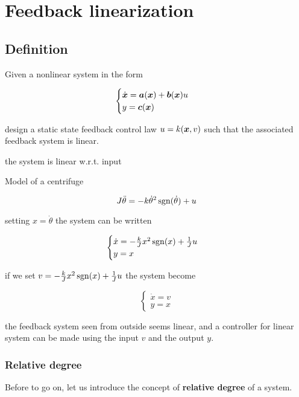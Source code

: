 \chapter{Feedback linearization}

\section{Definition}

Given a nonlinear system in the form

\[
    \begin{cases}
        \dot{\boldsymbol{x}} =\boldsymbol{a}(\boldsymbol{x}) + \boldsymbol{b}(\boldsymbol{x}) u \\
        y = \boldsymbol{c}(\boldsymbol{x})
    \end{cases}
\]

design a static state feedback control law $u = k(\boldsymbol{x},v)$ such that the associated feedback system is linear.

\begin{nb} the system is linear w.r.t. input \end{nb}

\begin{example}
    Model of a centrifuge

    \[
        J \ddot\theta = -k \dot \theta^2 \operatorname{sgn}(\dot \theta) + u
    \]

    setting $x = \dot\theta$ the system can be written

    \[
    \begin{cases}
        \dot x = - \frac{k}{J} x^2 \operatorname{sgn}(x) + \frac{1}{J} u \\
        y = x
    \end{cases}
    \]

    if we set $v = - \frac{k}{J}x^2 \operatorname{sgn}(x) + \frac{1}{J}u$ the system become

    \[
    \begin{cases}
        \dot x = v \\
        y = x
    \end{cases}
    \]

    the feedback system seen from outside seems linear, and a controller for linear system can be made using the input $v$ and the output $y$.
\end{example}

\subsection{Relative degree}

Before to go on, let us introduce the concept of \textbf{relative degree} of a system.

